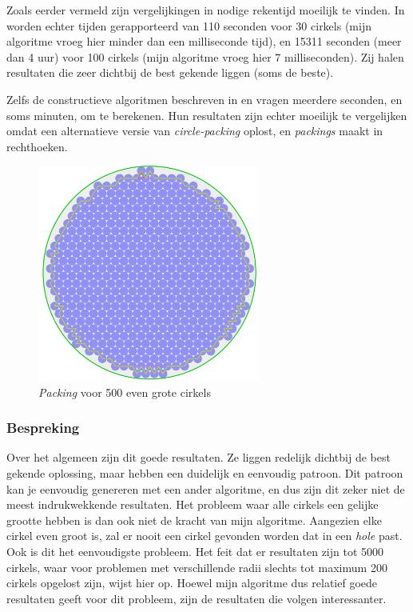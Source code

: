 \documentclass[12pt,a4paper,oneside]{book}
\begin{document}
Zoals eerder vermeld zijn vergelijkingen in nodige rekentijd moeilijk te vinden.
In \cite{grosso2010} worden echter tijden gerapporteerd van 110 seconden voor 30 cirkels (mijn algoritme vroeg hier minder dan een milliseconde tijd), en 15311 seconden (meer dan 4 uur) voor 100 cirkels (mijn algoritme vroeg hier 7 milliseconden).
Zij halen resultaten die zeer dichtbij de best gekende liggen (soms de beste).

Zelfs de constructieve algoritmen beschreven in \cite{akeb2006basic} en \cite{hifi2004approximate} vragen meerdere seconden, en soms minuten, om te berekenen.
Hun resultaten zijn echter moeilijk te vergelijken omdat \cite{akeb2006basic} een alternatieve versie van \textit{circle-packing} oplost, en \cite{hifi2004approximate} \textit{packings} maakt in rechthoeken.

\begin{figure}
  \centering
  \includegraphics[width=0.65\textwidth]{packing-even-groot-500.png}
  \caption{\textit{Packing} voor 500 even grote cirkels} \label{fig:packing-even-groot-500} 
\end{figure}

\subsubsection{Bespreking}

Over het algemeen zijn dit goede resultaten.
Ze liggen redelijk dichtbij de best gekende oplossing, maar hebben een duidelijk en eenvoudig patroon.
Dit patroon kan je eenvoudig genereren met een ander algoritme, en dus zijn dit zeker niet de meest indrukwekkende resultaten.
Het probleem waar alle cirkels een gelijke grootte hebben is dan ook niet de kracht van mijn algoritme.
Aangezien elke cirkel even groot is, zal er nooit een cirkel gevonden worden dat in een \textit{hole} past.
Ook is dit het eenvoudigste probleem.
Het feit dat er resultaten zijn tot 5000 cirkels, waar voor problemen met verschillende radii slechts tot maximum 200 cirkels opgelost zijn, wijst hier op.
Hoewel mijn algoritme dus relatief goede resultaten geeft voor dit probleem, zijn de resultaten die volgen interessanter.
\end{document}

